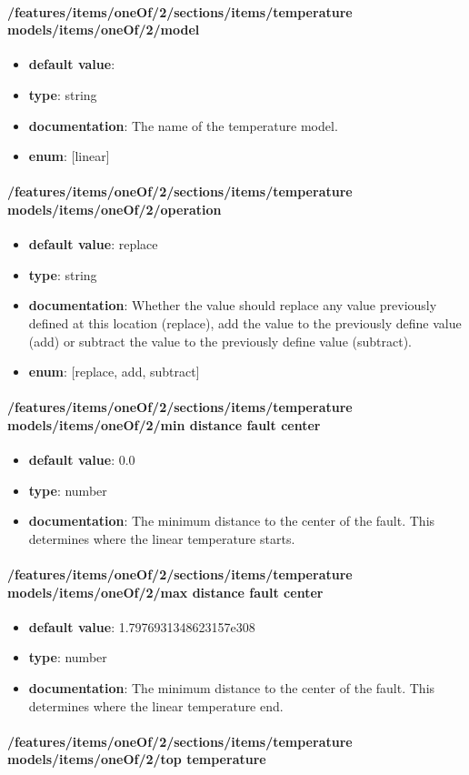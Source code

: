\paragraph{/features/items/oneOf/2/sections/items/temperature models/items/oneOf/2/model}
\begin{itemize}\item {\bf default value}: 
\item {\bf type}: string
\item {\bf documentation}: The name of the temperature model.
\item {\bf enum}: [linear]\end{itemize}\paragraph{/features/items/oneOf/2/sections/items/temperature models/items/oneOf/2/operation}
\begin{itemize}\item {\bf default value}: replace
\item {\bf type}: string
\item {\bf documentation}: Whether the value should replace any value previously defined at this location (replace), add the value to the previously define value (add) or subtract the value to the previously define value (subtract).
\item {\bf enum}: [replace, add, subtract]\end{itemize}\paragraph{/features/items/oneOf/2/sections/items/temperature models/items/oneOf/2/min distance fault center}
\begin{itemize}\item {\bf default value}: 0.0
\item {\bf type}: number
\item {\bf documentation}: The minimum distance to the center of the fault. This determines where the linear temperature starts.
\end{itemize}\paragraph{/features/items/oneOf/2/sections/items/temperature models/items/oneOf/2/max distance fault center}
\begin{itemize}\item {\bf default value}: 1.7976931348623157e308
\item {\bf type}: number
\item {\bf documentation}: The minimum distance to the center of the fault. This determines where the linear temperature end.
\end{itemize}\paragraph{/features/items/oneOf/2/sections/items/temperature models/items/oneOf/2/top temperature}
